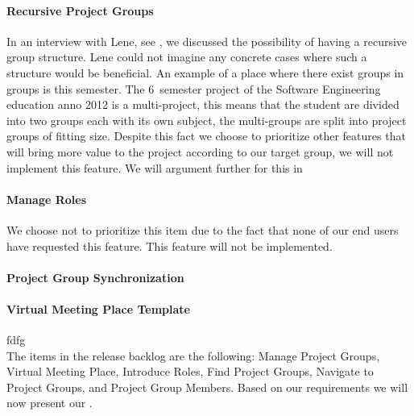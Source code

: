 \paragraph{Recursive Project Groups}
In an interview with Lene, see , we discussed the possibility of having a recursive group structure.
Lene could not imagine any concrete cases where such a structure would be beneficial. 
An example of a place where there exist groups in groups is this semester.
The 6\ths~semester project of the Software Engineering education anno 2012 is a multi-project, this means that the student are divided into two groups each with its own subject, the multi-groups are split into project groups of fitting size.
Despite this fact we choose to prioritize other features that will bring more value to the project according to our target group, we will not implement this feature. 
We will argument further for this in \secref{} 

\paragraph{Manage Roles}   
We choose not to prioritize this item due to the fact that none of our end users have requested this feature. 
This feature will not be implemented. 

\paragraph{Project Group Synchronization}


\paragraph{Virtual Meeting Place Template}

fdfg\\

The items in the release backlog are the following: Manage Project Groups, Virtual Meeting Place, Introduce Roles, Find Project Groups, Navigate to Project Groups, and Project Group Members. 
Based on our requirements we will now present our .





\begin{comment}
In the interview described in \appref{sec:lene} we learned that there is a need for having a concept of project groups in \moodle{}.  to enhance communication by sending messages from the \admpers{} to project groups through \moodle{}.
This evolves into two backlog items; integrate the concept of project groups into \moodle{} and allow the administrative personnel to post messages to the project group.
The former is represented as a backlog item which can be seen in \figref{fig:productbacklog}.
The latter is implemented by the \supervisorgroup{}.
\end{comment}


